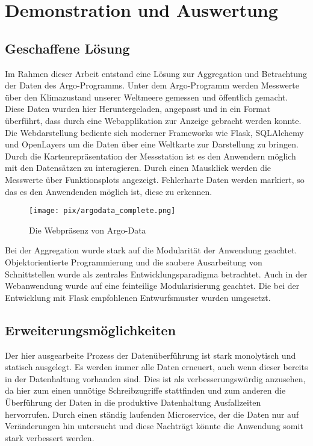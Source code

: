 \section{Demonstration und Auswertung}


\subsection{Geschaffene Lösung}

Im Rahmen dieser Arbeit entstand eine Lösung zur Aggregation und Betrachtung der Daten des Argo-Programms. Unter dem Argo-Programm werden Messwerte über den Klimazustand unserer Weltmeere gemessen und öffentlich gemacht. Diese Daten wurden hier Heruntergeladen, angepasst und in ein Format überführt, dass durch eine Webapplikation zur Anzeige gebracht werden konnte. Die Webdarstellung bediente sich moderner Frameworks wie Flask, SQLAlchemy und OpenLayers um die Daten über eine Weltkarte zur Darstellung zu bringen. Durch die Kartenrepräsentation der Messstation ist es den Anwendern möglich mit den Datensätzen zu interagieren. Durch einen Mausklick werden die Messwerte über Funktionsplots angezeigt.  Fehlerharte Daten werden markiert, so das es den Anwendenden möglich ist, diese zu erkennen.

\begin{figure}[H]
 \centering
 \texttt{[image: pix/argodata\_complete.png]}
 \caption{Die Webpräsenz von Argo-Data}
 \label{fig:argodataWeb}
\end{figure}

Bei der Aggregation wurde stark auf die Modularität der Anwendung geachtet. Objektorientierte Programmierung und die saubere Ausarbeitung von Schnittstellen wurde als zentrales Entwicklungsparadigma betrachtet. Auch in der Webanwendung wurde auf eine feinteilige Modularisierung geachtet. Die bei der Entwicklung mit Flask empfohlenen Entwurfsmuster wurden umgesetzt. 


\subsection{Erweiterungsmöglichkeiten}

Der hier ausgearbeite Prozess der Datenüberführung ist stark monolytisch und statisch ausgelegt. Es werden immer alle Daten erneuert, auch wenn dieser bereits in der Datenhaltung vorhanden sind. Dies ist als verbesserungswürdig anzusehen, da hier zum einen unnötige Schreibzugriffe stattfinden und zum anderen die Überführung der Daten in die produktive Datenhaltung Ausfallzeiten hervorrufen. Durch einen ständig laufenden Microservice, der die Daten nur auf Veränderungen hin untersucht und diese Nachträgt könnte die Anwendung somit stark verbessert werden. 


